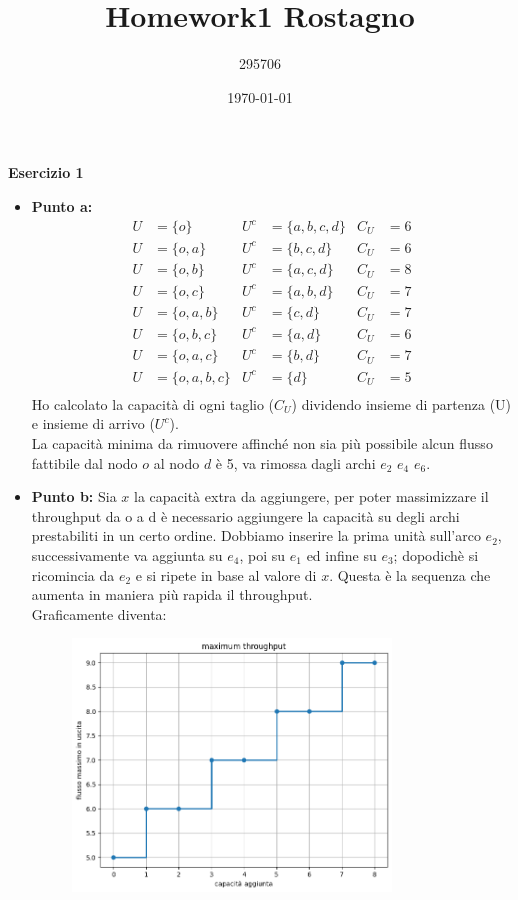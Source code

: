 \documentclass[a4paper,12pt]{article}
\begin{document}
	\title{\textbf{Homework1 Rostagno}}
	\author{295706}
	\date{\today}
	\maketitle
	
	\centering \textbf{Esercizio 1}\\
	\begin{itemize}
		\item \textbf{Punto a: } 
		\begin{align*}
			U &= \{o\} & U^c &= \{a, b, c, d\} & C_U &= 6 \\
			U &= \{o, a\} & U^c &= \{b, c, d\} & C_U &= 6 \\
			U &= \{o, b\} & U^c &= \{a, c, d\} & C_U &= 8 \\
			U &= \{o, c\} & U^c &= \{a, b, d\} & C_U &= 7 \\
			U &= \{o, a, b\} & U^c &= \{c, d\} & C_U &= 7 \\
			U &= \{o, b, c\} & U^c &= \{a, d\} & C_U &= 6 \\
			U &= \{o, a, c\} & U^c &= \{b, d\} & C_U &= 7 \\
			U &= \{o, a, b, c\} & U^c &= \{d\} & C_U &= 5 \\
			\end{align*}
			Ho calcolato la capacità di ogni taglio ($C_U$) dividendo insieme di partenza (U) e insieme di arrivo ($U^c$). \\
			La capacità minima da rimuovere affinché non sia più possibile alcun flusso fattibile dal nodo $o$ al nodo $d$ è 5, va rimossa dagli archi $e_2$ $e_4$ $e_6$.
			\item \textbf{Punto b: } Sia $x$ la capacità extra da aggiungere, per poter massimizzare il throughput da o a d è necessario aggiungere la capacità su degli archi prestabiliti in un certo ordine. Dobbiamo inserire la prima unità sull'arco $e_2$, successivamente va aggiunta su $e_4$, poi su $e_1$ ed infine su $e_3$; dopodichè si ricomincia da $e_2$ e si ripete in base al valore di $x$. Questa è la sequenza che aumenta in maniera più rapida il throughput.\\
			Graficamente diventa:
			\begin{figure}[h] %
				\centering %
				\includegraphics[width=0.8\textwidth]{graf1.png} %

\end{figure}
\end{itemize}
\end{document}
